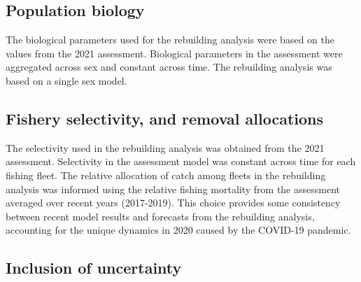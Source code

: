 \documentclass[11pt,
  english,
  letterpaper,
]{article}
\begin{document}
\leavevmode\tagmcend\tagstructend\par


\hypertarget{population-biology}{%
\subsection{Population biology}\label{population-biology}}

\leavevmode\tagmcend\tagstructend


The biological parameters used for the rebuilding analysis were based on the values from the 2021 assessment. Biological parameters in the assessment were aggregated across sex and constant across time. The rebuilding analysis was based on a single sex model.

\leavevmode\tagmcend\tagstructend\par


\hypertarget{fishery-selectivity-and-removal-allocations}{%
\subsection{Fishery selectivity, and removal allocations}\label{fishery-selectivity-and-removal-allocations}}

\leavevmode\tagmcend\tagstructend


The selectivity used in the rebuilding analysis was obtained from the 2021 assessment. Selectivity in the assessment model was constant across time for each fishing fleet. The relative allocation of catch among fleets in the rebuilding analysis was informed using the relative fishing mortality from the assessment averaged over recent years (2017-2019). This choice provides some consistency between recent model results and forecasts from the rebuilding analysis, accounting for the unique dynamics in 2020 caused by the COVID-19 pandemic.

\leavevmode\tagmcend\tagstructend\par


\hypertarget{inclusion-of-uncertainty}{%
\subsection{Inclusion of uncertainty}\label{inclusion-of-uncertainty}}
\end{document}
